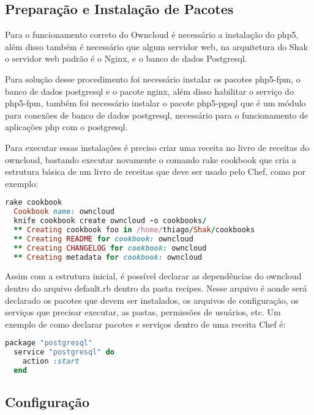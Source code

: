 \subsection{Preparação e Instalação de Pacotes}

Para o funcionamento correto do Owncloud é necessário a instalação do php5, além
disso também é necessário que algum servidor web, na arquitetura do Shak o servidor
web padrão é o Nginx, e o banco de dados Postgresql.

Para solução desse procedimento foi necessário instalar os pacotes php5-fpm, o banco
de dados postgresql e o pacote nginx, além disso habilitar o serviço do php5-fpm,
também foi necessário instalar o pacote php5-pgsql que é um módulo para
conexões de banco de dados postgresql, necessário para o funcionamento de
aplicações php com o postgresql.

Para executar essas instalações é preciso criar uma receita no livro de receitas
do owncloud, bastando executar novamente o comando rake cookbook que cria a estrutura básica
de um livro de receitas que deve ser usado pelo Chef, como por exemplo:

\begin{lstlisting}[language=Ruby,label=dice_index,caption={Exemplo de criação de estrutura básica de livro de receitas do owncloud com shak}]
  rake cookbook
  Cookbook name: owncloud
  knife cookbook create owncloud -o cookbooks/
  ** Creating cookbook foo in /home/thiago/Shak/cookbooks
  ** Creating README for cookbook: owncloud
  ** Creating CHANGELOG for cookbook: owncloud
  ** Creating metadata for cookbook: owncloud
\end{lstlisting}

Assim com a estrutura inicial, é possível declarar as dependências do owncloud
dentro do arquivo default.rb dentro da pasta recipes. Nesse arquivo é aonde
será declarado os pacotes que devem ser instalados, os arquivos de configuração,
os serviços que precisar executar, as pastas, permissões de usuários, etc. Um exemplo
de como declarar pacotes e serviços dentro de uma receita Chef é:

\begin{lstlisting}[language=Ruby,label=dice_index,caption={Exemplo de como habilitar serviço do postgresql com chef}]
  package "postgresql"
  service "postgresql" do
    action :start
  end
\end{lstlisting}

\subsection{Configuração}

